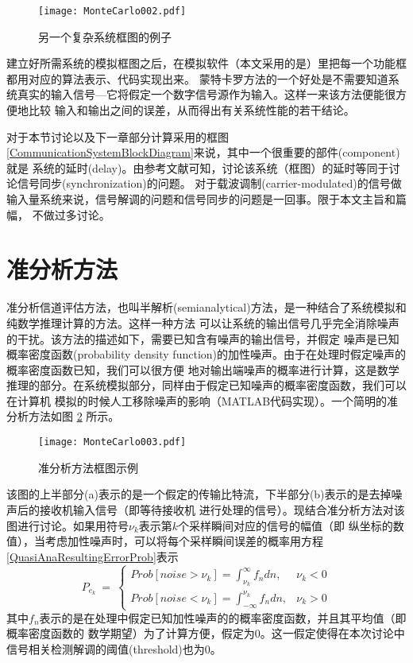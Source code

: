 \begin{figure}
[htbp]
\centering
\texttt{[image: MonteCarlo002.pdf]}
\caption{另一个复杂系统框图的例子}\label{BlockDiagramofReverseRadioLinkSimulation}
\end{figure}
建立好所需系统的模拟框图之后，在模拟软件（本文采用的是）里把每一个功能框都用对应的算法表示、代码实现出来。
蒙特卡罗方法的一个好处是不需要知道系统真实的输入信号---它将假定一个数字信号源作为输入。这样一来该方法便能很方便地比较
输入和输出之间的误差，从而得出有关系统性能的若干结论。
\par
对于本节讨论以及下一章部分计算采用的框图\ref{CommunicationSystemBlockDiagram}来说，其中一个很重要的部件(component)就是
系统的延时(delay)。由参考文献可知，讨论该系统（框图）的延时等同于讨论信号同步(synchronization)的问题。
对于载波调制(carrier-modulated)的信号做输入量系统来说，信号解调的问题和信号同步的问题是一回事。限于本文主旨和篇幅，
不做过多讨论。

\section{准分析方法}
准分析信道评估方法，也叫半解析(semianalytical)方法，是一种结合了系统模拟和纯数学推理计算的方法。这样一种方法
可以让系统的输出信号几乎完全消除噪声的干扰。该方法的描述如下，需要已知含有噪声的输出信号，并假定
噪声是已知概率密度函数(probability density function)的加性噪声。由于在处理时假定噪声的概率密度函数已知，我们可以很方便
地对输出端噪声的概率进行计算，这是数学推理的部分。在系统模拟部分，同样由于假定已知噪声的概率密度函数，我们可以在计算机
模拟的时候人工移除噪声的影响（MATLAB代码实现）。一个简明的准分析方法如图
\ref{IllusofQuasianalyticalMethod} 所示。
\begin{figure}
[htbp]
\centering
\texttt{[image: MonteCarlo003.pdf]}
\caption{准分析方法框图示例}\label{IllusofQuasianalyticalMethod}
\end{figure}
该图的上半部分(a)表示的是一个假定的传输比特流，下半部分(b)表示的是去掉噪声后的接收机输入信号（即等待接收机
进行处理的信号）。现结合准分析方法对该图进行讨论。如果用符号$\nu_{k}$表示第$k$个采样瞬间对应的信号的幅值（即
纵坐标的数值），当考虑加性噪声时，可以将每个采样瞬间误差的概率用方程\ref{QuasiAnaResultingErrorProb}表示
\begin{equation}\label{QuasiAnaResultingErrorProb}
    P_{e_{k}}~=~
    \begin{cases}
    \displaystyle{Prob[noise>\nu_{k}]=\int^{\infty}_{\nu_{k}}f_{n}dn}, & \nu_{k}<0 \\
    \displaystyle{Prob[noise<\nu_{k}]=\int^{\nu_{k}}_{-\infty}f_{n}dn}, & \nu_{k}>0
    \end{cases}
\end{equation}
其中$f_{n}$表示的是在处理中假定已知加性噪声的的概率密度函数，并且其平均值（即概率密度函数的
数学期望）为了计算方便，假定为$0$。这一假定使得在本次讨论中信号相关检测解调的阈值(threshold)也为$0$。

